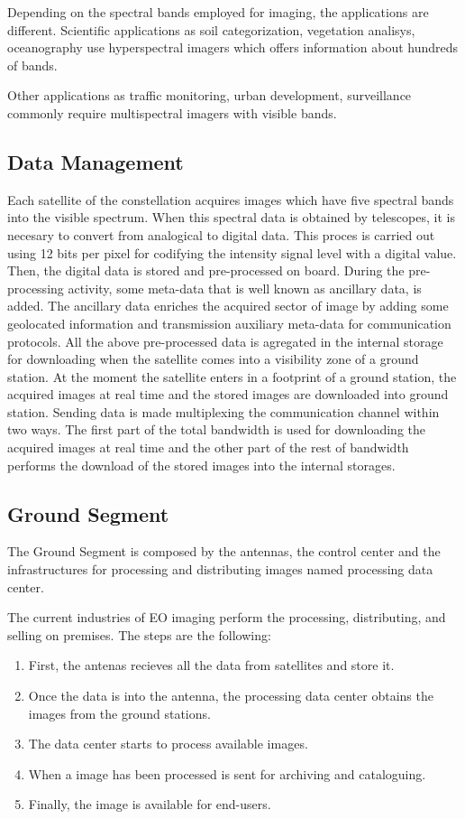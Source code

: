 Depending on the spectral bands employed for imaging, the applications are
different. Scientific applications as soil categorization, vegetation analisys,
oceanography use hyperspectral imagers which offers information about hundreds
of bands. 

Other applications as traffic monitoring, urban development,
surveillance commonly require multispectral imagers with visible bands.

\subsection{Data Management}

Each satellite of the constellation acquires images which have five spectral
bands into the visible spectrum. When this spectral data is
obtained by telescopes, it is necesary to convert from analogical to digital
data. This proces is carried out using 12 bits per pixel for codifying the
intensity signal level with a digital value. Then, the digital data is stored and pre-processed on
board. During the pre-processing activity, some meta-data that is well known as ancillary
data, is added. The ancillary data enriches the acquired sector of image by adding
some geolocated information and transmission auxiliary meta-data for communication
protocols. All the above pre-processed data is agregated in the
internal storage for downloading when the satellite comes into a visibility zone
of a ground station. At the moment the satellite enters in a footprint of a
ground station, the acquired images at real time and the stored images are
downloaded into ground station. Sending data is made multiplexing the
communication channel within two ways. The first part of the total bandwidth
is used for downloading the acquired images at real time and the other part of
the rest of bandwidth performs the download of the stored images into the
internal storages.

\subsection{Ground Segment}

The Ground Segment is composed by the antennas, the control center and the
infrastructures for processing and distributing images named processing
data center. 

The current industries of EO imaging perform the processing, distributing, and
selling on premises. The steps are the following:
\begin{enumerate}
\item First, the antenas recieves all the data from satellites and store it.
\item Once the data is into the antenna, the processing data center obtains the
  images from the ground stations.
\item The data center starts to process available images.
\item When a image has been processed is sent for archiving and
  cataloguing. 
\item Finally, the image is available for end-users.
\end{enumerate}

